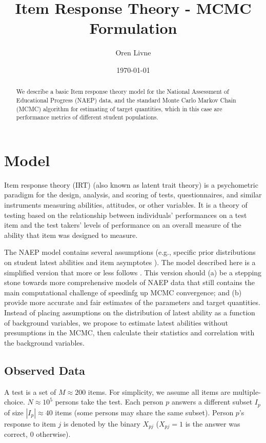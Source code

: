 \documentclass{article}
\begin{document}
\title{Item Response Theory - MCMC Formulation}
\author{Oren Livne}
\date{\today}

\maketitle

\begin{abstract}
  We describe a basic Item response theory model for the National Assessment of
  Educational Progress (NAEP) data, and the standard Monte Carlo Markov Chain (MCMC)
  algorithm for estimating of target quantities, which in this case are
  performance metrics of different student populations.
\end{abstract}

\section{Model}
Item response theory (IRT) (also known as latent trait theory) is a psychometric paradigm for the design, analysis, and scoring of tests, questionnaires, and similar instruments measuring abilities, attitudes, or other variables. It is a theory of testing based on the relationship between individuals' performances on a test item and the test takers' levels of performance on an overall measure of the ability that item was designed to measure.

The NAEP model contains several assumptions (e.g., specific prior distributions on student
latest abilities and item asymptotes \cite{matt02}). The model described here is a simplified
version that more or less follows \cite[Sec. 1.7]{junker}. This version should (a) be a stepping
stone towards more comprehensive models of NAEP data that still contains the main computational
challenge of speedinfg up MCMC convergence; and (b) provide more accurate and fair estimates
of the parameters and target quantities. Instead of placing assumptions on the distribution of
latest ability as a function of background variables, we propose to estimate latest abilities
without presumptions in the MCMC, then calculate their statistics and correlation with
the background variables. 

\subsection{Observed Data}
A test is a set of $M \approx 200$ items. For simplicity, we assume all items are multiple-choice. $N \approx 10^5$ persons take the test. Each person $p$ answers a different subset $I_p$ of size $|I_p| \approx 40$ items (some persons may share the same subset). Person $p$'s response to item $j$ is denoted by the binary $X_{pj}$ ($X_{pj}=1$ is the answer was correct, $0$ otherwise). 
\end{document}
